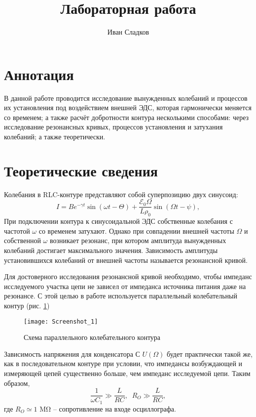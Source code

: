 \documentclass[a4paper]{article}
\title{Лабораторная работа \labnum \space \labname}
\author{Иван Сладков}
\begin{document}
\maketitle
\thispagestyle{empty}
\section{Аннотация}
В данной работе проводится исследование вынужденных колебаний и процессов их установления под воздействием внешней ЭДС, которая гармонически меняется со временем; а также расчёт добротности контура несколькими способами: через исследование резонансных кривых, процессов установления и затухания колебаний; а также теоретически.
\section{Теоретические сведения}

Колебания в RLC-контуре представляют собой суперпозицию двух синусоид:
\begin{equation}
	I= B e^{-\gamma t} \sin (\omega t - \Theta)+ \frac{\mathcal{E}_0 \Omega}{L \rho_0} \sin (\Omega t - \psi),
	\label{law}
\end{equation}
При подключении контура к синусоидальной ЭДС собственные колебания с частотой $\omega$ со временем затухают. Однако при совпадении внешней частоты $ \Omega $ и собственной $ \omega $ возникает резонанс, при котором амплитуда вынужденных колебаний достигает максимального значения. Зависимость амплитуды установившихся колебаний от внешней частоты называется резонансной кривой.

Для достоверного исследования резонансной кривой необходимо, чтобы импеданс исследуемого участка цепи не зависел от импеданса источника питания даже на резонансе. С этой целью в работе используется параллельный колебательный контур (рис. \ref{fig:scheme})
\begin{figure}
	\centering
	\texttt{[image: Screenshot\_1]}
	\caption{Схема параллельного колебательного контура}
	\label{fig:scheme}
\end{figure}
Зависимость напряжения для конденсатора С $ U(\Omega) $ будет практически такой же, как в последовательном контуре при условии, что импедансы возбуждающей и измеряющей цепей существенно больше, чем импеданс исследуемой цепи. Таким образом,
\begin{equation}
	\frac{1}{\omega C_1}\gg \frac{L}{R C}, \; \; R_O \gg \frac{L}{R C},
\end{equation}
где $ R_O \simeq 1$ \si{\mega \ohm} -- сопротивление на входе осциллографа.
\end{document}
